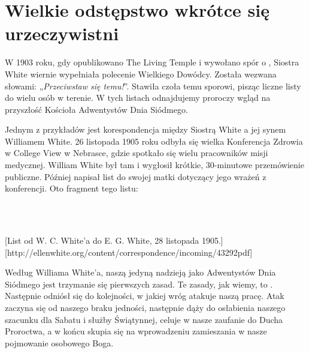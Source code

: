 
\chapter{Wielkie odstępstwo wkrótce się urzeczywistni} \label{chap:apostasy}

W 1903 roku, gdy opublikowano The Living Temple i wywołano spór o , Siostra White wiernie wypełniała polecenie Wielkiego Dowódcy. Została wezwana słowami: „\textit{Przeciwstaw się temu!}”. Stawiła czoła temu sporowi, pisząc liczne listy do wielu osób w terenie. W tych listach odnajdujemy proroczy wgląd na przyszłość Kościoła Adwentystów Dnia Siódmego.

Jednym z przykładów jest korespondencja między Siostrą White a jej synem Williamem White. 26 listopada 1905 roku odbyła się wielka Konferencja Zdrowia w College View w Nebrasce, gdzie spotkało się wielu pracowników misji medycznej. William White był tam i wygłosił krótkie, 30-minutowe przemówienie publiczne. Później napisał list do swojej matki dotyczący jego wrażeń z konferencji. Oto fragment tego listu:

 \\
 \\

[List od W. C. White'a do E. G. White, 28 listopada 1905.][http://ellenwhite.org/content/correspondence/incoming/43292pdf]

Według Williama White'a, naszą jedyną nadzieją jako Adwentystów Dnia Siódmego jest trzymanie się pierwszych zasad. Te zasady, jak wiemy, to . Następnie odniósł się do kolejności, w jakiej wróg atakuje naszą pracę. Atak zaczyna się od naszego braku jedności, następnie dąży do osłabienia naszego szacunku dla Sabatu i służby Świątynnej, celuje w nasze zaufanie do Ducha Proroctwa, a w końcu skupia się na wprowadzeniu zamieszania w nasze pojmowanie osobowego Boga.

